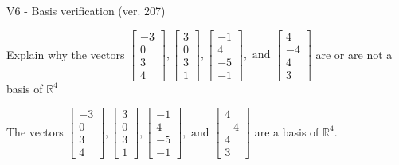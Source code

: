 \begin{exercise}
  \begin{exerciseTitle}V6 - Basis verification (ver. 207)\end{exerciseTitle}
  \begin{exerciseStatement}
    Explain why the vectors \(\left[\begin{array}{r}
-3 \\
0 \\
3 \\
4
\end{array}\right] , \left[\begin{array}{r}
3 \\
0 \\
3 \\
1
\end{array}\right] , \left[\begin{array}{r}
-1 \\
4 \\
-5 \\
-1
\end{array}\right] , \text{ and } \left[\begin{array}{r}
4 \\
-4 \\
4 \\
3
\end{array}\right]\) are or are not a basis of \(\mathbb{R}^4\)	


  \end{exerciseStatement}
  \begin{exerciseAnswer}
   The vectors \(\left[\begin{array}{r}
-3 \\
0 \\
3 \\
4
\end{array}\right] , \left[\begin{array}{r}
3 \\
0 \\
3 \\
1
\end{array}\right] , \left[\begin{array}{r}
-1 \\
4 \\
-5 \\
-1
\end{array}\right] , \text{ and } \left[\begin{array}{r}
4 \\
-4 \\
4 \\
3
\end{array}\right]\) 
  	 are  a basis of \(\mathbb{R}^4\).
  


  \end{exerciseAnswer}
\end{exercise}